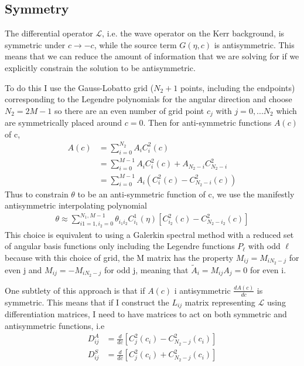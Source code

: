 \documentclass[aps,prd,amsmath,showpacs,amssymb,superscriptaddress,nofootinbib,longbibliography,eqsecnum,preprintnumbers]{revtex4-1}
\begin{document}
\subsection{Symmetry}

The differential operator $\mathcal L$, i.e. the wave operator on the Kerr background, is symmetric under $c\to -c$, while the source term $G(\eta,c)$ is antisymmetric. This means that we can reduce the amount of information that we are solving for if we explicitly constrain the solution to be antisymmetric.

To do this I use the Gauss-Lobatto grid ($N_2+1$ points, including the endpoints) corresponding to the Legendre polynomials for the angular direction and choose $N_2=2M-1$ so there are an even number of grid point $c_j$ with $j=0,...N_2$ which are symmetrically placed around $c=0$. Then for anti-symmetric functions $A(c)$ of c,
\begin{align}
A(c)&=\sum_{i=0}^{N_2}A_iC^2_i(c) \nonumber \\
&=\sum_{i=0}^{M-1}A_iC^2_i(c)+A_{N_2-i}C^2_{N_2-i} \nonumber \\
&=\sum_{i=0}^{M-1}A_{i}(C^2_{i}(c)-C^2_{N_2-i}(c))
\end{align}
Thus to constrain $\theta$ to be an anti-symmetric function of c, we use the manifestly antisymmetric interpolating polynomial
\begin{align}
\theta\approx \sum_{i1=1,i_2=0}^{N_1,M-1}\theta_{i_1i_2}C_{i_1}^1(\eta)\left[C_{i_2}^2(c)-C_{N_2-i_2}^2(c)\right]
\end{align}
This choice is equivalent to using a Galerkin spectral method with a reduced set of angular basis functions only including the Legendre functions $P_{\ell}$ with odd $\ell$ because with this choice of grid, the M matrix has the property $M_{ij}=M_{iN_2-j}$ for even j and $M_{ij}=-M_{iN_2-j}$ for odd j, meaning that $\tilde A_i=M_{ij}A_j =0$ for even i.

One subtlety of this approach is that if $A(c)$ i antisymmetric $\frac{dA(c)}{dc}$ is symmetric. This means that if I construct the $L_{ij}$ matrix representing $\mathcal L$ using differentiation matrices, I need to have matrices to act on both symmetric and antisymmetric functions, i.e
\begin{align}
D^A_{ij}&=\frac{d}{dc}\left[C^2_j(c_i)-C^2_{N_2-j}(c_i)\right] \nonumber \\
D^S_{ij}&=\frac{d}{dc}\left[C^2_j(c_i)+C^2_{N_2-j}(c_i)\right] \nonumber \\
\end{align}
\end{document}
